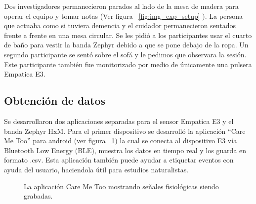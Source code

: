 Dos investigadores permanecieron parados al lado de la mesa de madera para operar el equipo y tomar notas (Ver figura ~\ref{fig:img_exp_setup} ). La persona que actuaba como si tuviera demencia y el cuidador permanecieron sentados frente a frente en una mesa circular. Se les pidi\'o a los participantes usar el cuarto de ba\~no para vestir la banda Zephyr debido a que se pone debajo de la ropa. Un segundo participante se sent\'o sobre el sof\'a y le pedimos que observara la sesi\'on. Este participante tambi\'en fue monitorizado por medio de \'unicamente una pulsera Empatica E3.


\subsection{Obtenci\'on de datos}\label{secc:datagathering}
Se desarrollaron dos aplicaciones separadas para el sensor Empatica E3 y el banda Zephyr HxM. Para el primer dispositivo se desarroll\'o la aplicaci\'on ``Care Me Too'' para android (ver figura ~\ref{fig:caremetoo}) la cual se conecta al dispositivo E3 v\'ia Bluetooth Low Energy (BLE), muestra los datos en tiempo real y los guarda en formato .csv. Esta aplicaci\'on tambi\'en puede ayudar a etiquetar eventos con ayuda del usuario, haciendola \'util para estudios naturalistas.


\begin{figure}[h]
        \centering
        \caption{La aplicaci\'on Care Me Too mostrando se\~nales fisiol\'ogicas siendo grabadas.}\label{fig:caremetoo}
\end{figure}

